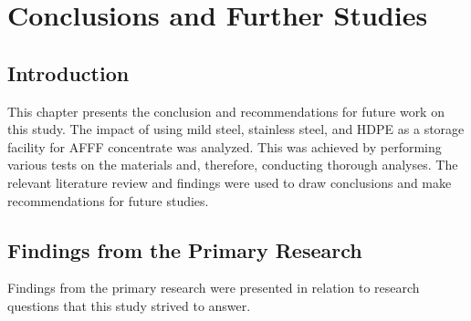 \chapter{Conclusions and Further Studies}
\section{Introduction}
This chapter presents the conclusion and recommendations for future work on this study. The impact of using mild steel, stainless steel, and HDPE as a storage facility for AFFF concentrate was analyzed. This was achieved by performing various tests on the materials and, therefore, conducting thorough analyses. The relevant literature review and findings were used to draw conclusions and make recommendations for future studies.

\section{Findings from the Primary Research}
Findings from the primary research were presented in relation to research questions that this study strived to answer.

